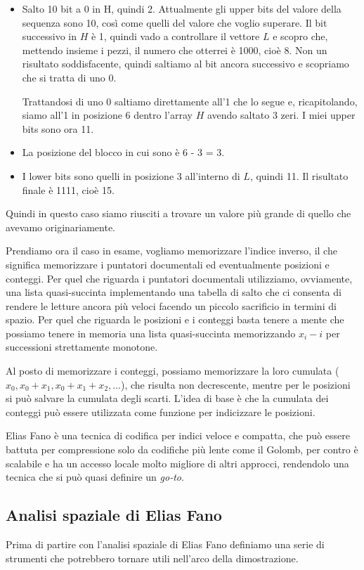 \begin{itemize}
	\item Salto 10 bit a 0 in H, quindi 2. Attualmente gli upper bits del valore della sequenza sono 10, così come quelli del valore che voglio superare. Il bit successivo in $H$ è 1, quindi vado a controllare il vettore $L$ e scopro che, mettendo insieme i pezzi, il numero che otterrei è 1000, cioè 8. Non un risultato soddisfacente, quindi saltiamo al bit ancora successivo e scopriamo che si tratta di uno 0.

	      Trattandosi di uno 0 saltiamo direttamente all'1 che lo segue e, ricapitolando, siamo all'1 in posizione 6 dentro l'array $H$ avendo saltato 3 zeri. I miei upper bits sono ora 11.
	\item La posizione del blocco in cui sono è 6 - 3 = 3.
	\item I lower bits sono quelli in posizione 3 all'interno di $L$, quindi 11. Il risultato finale è 1111, cioè 15.
\end{itemize}
Quindi in questo caso siamo riusciti a trovare un valore più grande di quello che avevamo originariamente.

Prendiamo ora il caso in esame, vogliamo memorizzare l'indice inverso, il che significa memorizzare i puntatori documentali ed eventualmente posizioni e conteggi. Per quel che riguarda i puntatori documentali utilizziamo, ovviamente, una lista quasi-succinta implementando una tabella di salto che ci consenta di rendere le letture ancora più veloci facendo un piccolo sacrificio in termini di spazio. Per quel che riguarda le posizioni e i conteggi basta tenere a mente che possiamo tenere in memoria una lista quasi-succinta memorizzando $x_i - i$  per successioni strettamente monotone.

Al posto di memorizzare i conteggi, possiamo memorizzare la loro cumulata ($x_0, x_0 + x_1, x_0 + x_1 + x_2, \dots$), che risulta non decrescente, mentre per le posizioni si può salvare la cumulata degli scarti. L'idea di base è che la cumulata dei conteggi può essere utilizzata come funzione per indicizzare le posizioni.

Elias Fano è una tecnica di codifica per indici veloce e compatta, che può essere battuta per compressione solo da codifiche più lente come il Golomb, per contro è scalabile e ha un accesso locale molto migliore di altri approcci, rendendolo una tecnica che si può quasi definire un \textit{go-to}.
\subsection{Analisi spaziale di Elias Fano}
Prima di partire con l'analisi spaziale di Elias Fano definiamo una serie di strumenti che potrebbero tornare utili nell'arco della dimostrazione.


